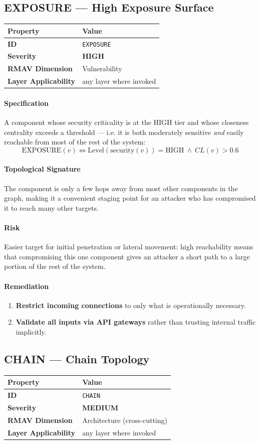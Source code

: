 \documentclass[11pt]{article}
\makeatletter
\newcommand{\HIGH}{\textcolor{orange!80!black}{\textbf{HIGH}}}
\newcommand{\MEDIUM}{\textcolor{yellow!50!black}{\textbf{MEDIUM}}}
\newcommand{\patternprop}[4]{%
  \begin{center}
  \begin{tabular}{@{}ll@{}}
  \toprule
  \textbf{Property} & \textbf{Value} \\
  \midrule
  \textbf{ID} & \texttt{#1} \\
  \textbf{Severity} & #2 \\
  \textbf{RMAV Dimension} & #3 \\
  \textbf{Layer Applicability} & #4 \\
  \bottomrule
  \end{tabular}
  \end{center}
}
\makeatother
\begin{document}
\subsection{EXPOSURE --- High Exposure Surface}
\patternprop{EXPOSURE}{\HIGH}{Vulnerability}{any layer where invoked}

\paragraph{Specification}
A component whose security criticality is at the HIGH tier and whose closeness centrality exceeds a threshold --- i.e. it is both moderately sensitive \emph{and} easily reachable from most of the rest of the system:
\[
\mathrm{EXPOSURE}(v) \Leftrightarrow \mathrm{Level}(\mathrm{security}(v)) = \mathrm{HIGH}\ \land\ CL(v) > 0.6
\]

\paragraph{Topological Signature}
The component is only a few hops away from most other components in the graph, making it a convenient staging point for an attacker who has compromised it to reach many other targets.

\paragraph{Risk}
Easier target for initial penetration or lateral movement: high reachability means that compromising this one component gives an attacker a short path to a large portion of the rest of the system.

\paragraph{Remediation}
\begin{enumerate}[leftmargin=*]
\item \textbf{Restrict incoming connections} to only what is operationally necessary.
\item \textbf{Validate all inputs via API gateways} rather than trusting internal traffic implicitly.
\end{enumerate}

\subsection{CHAIN --- Chain Topology}
\patternprop{CHAIN}{\MEDIUM}{Architecture (cross-cutting)}{any layer where invoked}
\end{document}
